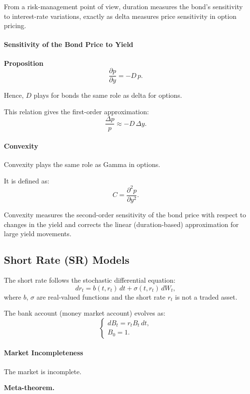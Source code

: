 \documentclass[12pt,a4paper]{article}
\theoremstyle{definition}
\begin{document}
From a risk-management point of view, duration measures the bond's sensitivity to interest-rate variations, exactly as delta measures price sensitivity in option pricing.

\paragraph{Sensitivity of the Bond Price to Yield}

\textbf{Proposition}
\[
\frac{\partial p}{\partial y} = -D \, p.
\]

Hence, $D$ plays for bonds the same role as delta for options.

This relation gives the first-order approximation:
\[
\frac{\Delta p}{p} \approx -D \, \Delta y.
\]

\paragraph{Convexity}

Convexity plays the same role as Gamma in options.

It is defined as:
\[
C = \frac{\partial^2 p}{\partial y^2}.
\]

Convexity measures the second-order sensitivity of the bond price with respect to changes in the yield and corrects the linear (duration-based) approximation for large yield movements.

\subsection{Short Rate (SR) Models}

The short rate follows the stochastic differential equation:
\[
dr_t = b(t, r_t) \, dt + \sigma(t, r_t) \, dW_t, \tag{SR}
\]
where $b$, $\sigma$ are real-valued functions and the short rate $r_t$ is not a traded asset.

The bank account (money market account) evolves as:
\[
\begin{cases}
dB_t = r_t B_t \, dt, \\
B_0 = 1.
\end{cases}
\]

\paragraph{Market Incompleteness}

The market is incomplete.

\textbf{Meta-theorem.}
\end{document}
